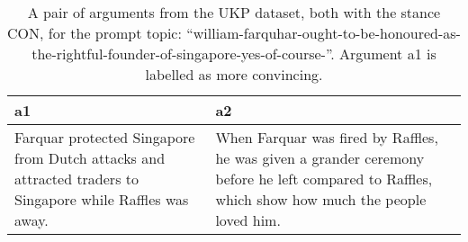 \begin{table}
\centering
\caption{A pair of arguments from the UKP dataset, both with the stance CON, for the prompt topic: ``william-farquhar-ought-to-be-honoured-as-the-rightful-founder-of-singapore-yes-of-course-''. Argument a1 is labelled as more convincing.}
\begin{tabular}{p{6cm}|p{6cm}}
\toprule
                                                                                                        a1 &                                                                                                                                                a2 \\
\midrule
 Farquar protected Singapore from Dutch attacks and attracted traders to Singapore while Raffles was away. &  When Farquar was fired by Raffles, he was given a grander ceremony before he left compared to Raffles, which show how much the people loved him. \\
\bottomrule
\end{tabular}
\end{table}
